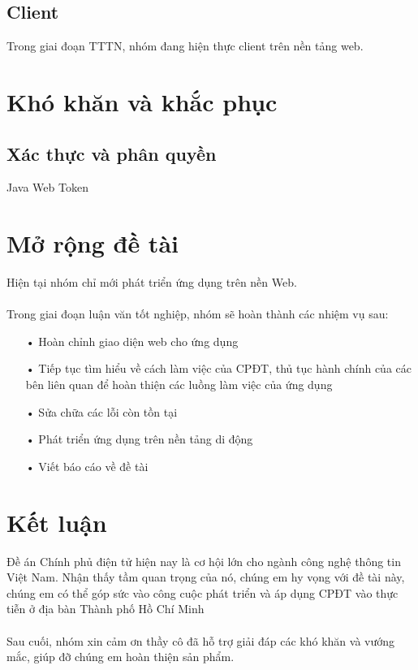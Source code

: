 \documentclass[a4paper]{article}
\begin{document}
\subsection{Client}
Trong giai đoạn TTTN, nhóm đang hiện thực client trên nền tảng web.
\section{Khó khăn và khắc phục}
\subsection{Xác thực và phân quyền}
Java Web Token

\section{Mở rộng đề tài}
Hiện tại nhóm chỉ mới phát triển ứng dụng trên nền Web. \\ 
\\
Trong giai đoạn luận văn tốt nghiệp, nhóm sẽ hoàn thành các nhiệm vụ sau:
\begin{itemize}
	\item[•]Hoàn chỉnh giao diện web cho ứng dụng
	\item[•]Tiếp tục tìm hiểu về cách làm việc của CPĐT, thủ tục hành chính của các bên liên quan để hoàn thiện các luồng làm việc của ứng dụng
	\item[•]Sửa chữa các lỗi còn tồn tại
	\item[•]Phát triển ứng dụng trên nền tảng di động
	\item[•]Viết báo cáo về đề tài
\end{itemize}
\section{Kết luận}
Đề án Chính phủ điện tử hiện nay là cơ hội lớn cho ngành công nghệ thông tin Việt Nam. Nhận thấy tầm quan trọng của nó, chúng em hy vọng với đề tài này, chúng em có thể góp sức vào công cuộc phát triển và áp dụng CPĐT vào thực tiễn ở địa bàn Thành phố Hồ Chí Minh \\
\\
Sau cuối, nhóm xin cảm ơn thầy cô đã hỗ trợ giải đáp các khó khăn và vướng mắc, giúp đỡ chúng em hoàn thiện sản phẩm.

\newpage
\end{document}

